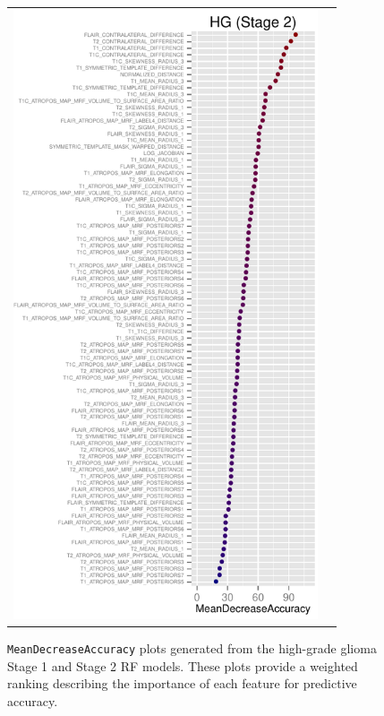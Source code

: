 \documentclass[preprint,authoryear,review,12pt]{elsarticle}
\begin{document}
\begin{figure}
{\begin{tabular}{cc}
  \includegraphics[width=90mm]{BRATS_HG_MAP_MRF.pdf} \\
  \end{tabular}
  }
  \caption{{\tt MeanDecreaseAccuracy} plots generated from the high-grade glioma
  Stage 1 and Stage 2 RF models.  These plots provide a weighted 
  ranking describing the importance of each feature for predictive accuracy. 
  }
  \label{fig:hgimportance}
\end{figure}
\end{document}
